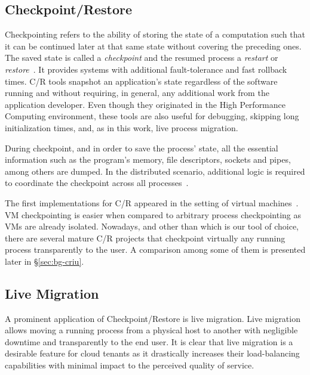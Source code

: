 \subsection{Checkpoint/Restore}

Checkpointing refers to the ability of storing the state of a computation such that it can be continued later at that same state without covering the preceding ones.
The saved state is called a \textit{checkpoint} and the resumed process a \textit{restart} or \textit{restore}~\cite{Schulz2011}.
It provides systems with additional fault-tolerance and fast rollback times.
C/R tools snapshot an application's state regardless of the software running and without requiring, in general, any additional work from the application developer.
Even though they originated in the High Performance Computing environment, these tools are also useful for debugging, skipping long initialization times, and, as in this work, live process migration.

During checkpoint, and in order to save the process' state, all the essential information such as the program's memory, file descriptors, sockets and pipes, among others are dumped.
In the distributed scenario, additional logic is required to coordinate the checkpoint across all processes~\cite{Raynal2013}.


The first implementations for C/R appeared in the setting of virtual machines~\cite{Clark2005}.
VM checkpointing is easier when compared to arbitrary process checkpointing as VMs are already isolated.
Nowadays, and other than \criu which is our tool of choice, there are several mature C/R projects that checkpoint virtually any running process transparently to the user.
A comparison among some of them is presented later in \S\ref{sec:bg-criu}.

\subsection{Live Migration}

A prominent application of Checkpoint/Restore is live migration.
Live migration allows moving a running process from a physical host to another with negligible downtime and transparently to the end user.
It is clear that live migration is a desirable feature for cloud tenants as it drastically increases their load-balancing capabilities with minimal impact to the perceived quality of service.

